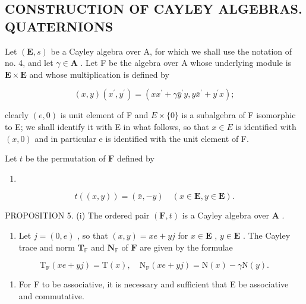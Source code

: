 \subsection{CONSTRUCTION OF CAYLEY ALGEBRAS. QUATERNIONS}

Let \((\mathbf{E}, s)\) be a Cayley algebra over A, for which we shall use the notation of no. 4, and let \(\gamma \in \mathbf{A}\) . Let F be the algebra over A whose underlying module is \(\mathbf{E} \times \mathbf{E}\) and whose multiplication is defined by

\[
(x, y) (x ^ {\prime}, y ^ {\prime}) = (x x ^ {\prime} + \gamma \bar {y} ^ {\prime} y, y \bar {x} ^ {\prime} + y ^ {\prime} x);\tag{22}
\]

clearly \((e,0)\) is unit element of F and \(E \times \{0\}\) is a subalgebra of F isomorphic to E; we shall identify it with E in what follows, so that \(x \in E\) is identified with \((x,0)\) and in particular e is identified with the unit element of F.

Let \(t\) be the permutation of \(\mathbf{F}\) defined by

\begin{enumerate}
\def\labelenumi{(\arabic{enumi})}
\setcounter{enumi}{22}
\tightlist
\item
\end{enumerate}

\[
t ((x, y)) = (\bar {x}, - y) \quad (x \in \mathbf {E}, y \in \mathbf {E}).
\]

PROPOSITION 5. (i) The ordered pair \((\mathbf{F}, t)\) is a Cayley algebra over \(\mathbf{A}\) .

\begin{enumerate}
\def\labelenumi{(\roman{enumi})}
\setcounter{enumi}{1}
\tightlist
\item
  Let \(j = (0, e)\) , so that \((x, y) = xe + yj\) for \(x \in \mathbf{E}\) , \(y \in \mathbf{E}\) . The Cayley trace and norm \(\mathbf{T}_{\mathbb{F}}\) and \(\mathbf{N}_{\mathbb{F}}\) of \(\mathbf{F}\) are given by the formulae
\end{enumerate}

\[
\mathrm{T} _ {\mathrm{F}} (x e + y j) = \mathrm{T} (x), \quad \mathrm{N} _ {\mathrm{F}} (x e + y j) = \mathrm{N} (x) - \gamma \mathrm{N} (y).\tag{24}
\]

\begin{enumerate}
\def\labelenumi{(\roman{enumi})}
\setcounter{enumi}{2}
\tightlist
\item
  For F to be associative, it is necessary and sufficient that E be associative and commutative.
\end{enumerate}

